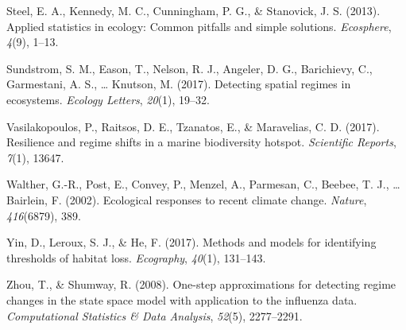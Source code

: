 \documentclass[12pt,twoside,openany]{reedthesis}
\begin{document}
\hypertarget{ref-steel2013applied}{}
Steel, E. A., Kennedy, M. C., Cunningham, P. G., \& Stanovick, J. S.
(2013). Applied statistics in ecology: Common pitfalls and simple
solutions. \emph{Ecosphere}, \emph{4}(9), 1--13.

\hypertarget{ref-sundstrom_detecting_2017}{}
Sundstrom, S. M., Eason, T., Nelson, R. J., Angeler, D. G., Barichievy,
C., Garmestani, A. S., \ldots{} Knutson, M. (2017). Detecting spatial
regimes in ecosystems. \emph{Ecology Letters}, \emph{20}(1), 19--32.

\hypertarget{ref-vasilakopoulos2017resilience}{}
Vasilakopoulos, P., Raitsos, D. E., Tzanatos, E., \& Maravelias, C. D.
(2017). Resilience and regime shifts in a marine biodiversity hotspot.
\emph{Scientific Reports}, \emph{7}(1), 13647.

\hypertarget{ref-walther_ecological_2002}{}
Walther, G.-R., Post, E., Convey, P., Menzel, A., Parmesan, C., Beebee,
T. J., \ldots{} Bairlein, F. (2002). Ecological responses to recent
climate change. \emph{Nature}, \emph{416}(6879), 389.

\hypertarget{ref-yin2017methods}{}
Yin, D., Leroux, S. J., \& He, F. (2017). Methods and models for
identifying thresholds of habitat loss. \emph{Ecography}, \emph{40}(1),
131--143.

\hypertarget{ref-zhou2008one}{}
Zhou, T., \& Shumway, R. (2008). One-step approximations for detecting
regime changes in the state space model with application to the
influenza data. \emph{Computational Statistics \& Data Analysis},
\emph{52}(5), 2277--2291.


\end{document}
